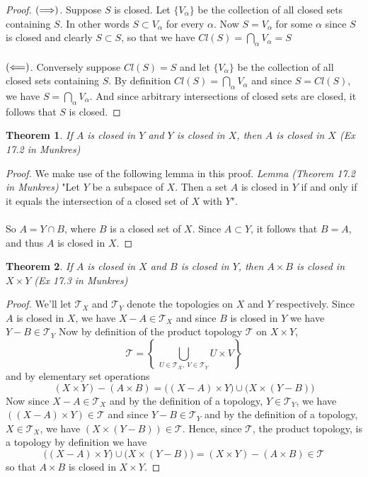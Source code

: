 \documentclass{article}
\newtheorem{theorem}{Theorem}[section]
\theoremstyle{remark}
\theoremstyle{definition}
\newcommand{\simplies}{\DOTSB\Longrightarrow}
\newcommand{\lsimplies}{\DOTSB\Longleftarrow}
\begin{document}
\begin{proof}[Proof]
$(\simplies)$. Suppose $S$ is closed. Let $\{V_{\alpha}\}$ be the collection of all closed sets containing $S$. In other words $S \subset V_{\alpha}$ for every $\alpha$. Now $S = V_{\alpha}$ for some $\alpha$ since $S$ is closed and clearly $S \subset S$, so that we have $Cl(S) = \bigcap_{\alpha}V_{\alpha} = S$
\\ \\ 
$(\lsimplies)$. Conversely suppose $Cl(S) = S$ and let $\{V_{\alpha}\}$ be the collection of all closed sets containing $S$. By definition $Cl(S) = \bigcap_{\alpha}V_{\alpha}$ and since $S = Cl(S)$, we have $S = \bigcap_{\alpha}V_{\alpha}$. And since arbitrary intersections of closed sets are closed, it follows that $S$ is closed.
\end{proof}
\medskip
\begin{theorem}
If $A$ is closed in $Y$ and $Y$ is closed in $X$, then $A$ is closed in $X$ (Ex 17.2 in Munkres)
\end{theorem}

\begin{proof}
We make use of the following lemma in this proof. 
\textit{Lemma (Theorem 17.2 in Munkres)} "Let $Y$ be a subspace of $X$. Then a set $A$ is closed in $Y$ if and only if it equals the intersection of a closed set of $X$ with $Y$".
\\ \\
So $A = Y \cap B$, where $B$ is a closed set of $X$. Since $A \subset Y$, it follows that $B = A$, and thus $A$ is closed in $X$.
\end{proof}
\medskip
\begin{theorem}
If $A$ is closed in $X$ and $B$ is closed in $Y$, then $A \times B$ is closed in $X \times Y$ (Ex 17.3 in Munkres)
\end{theorem}

\begin{proof}
We'll let $\mathcal{T}_X$ and $\mathcal{T}_Y$ denote the topologies on $X$ and $Y$ respectively. Since $A$ is closed in $X$, we have $X - A \in \mathcal{T}_X$ and since $B$ is closed in $Y$ we have $Y - B \in \mathcal{T}_Y$ Now by definition of the product topology $\mathcal{T}$ on $X \times Y$, $$\mathcal{T} = \left\{ \ \bigcup_{U \in \mathcal{T}_X, \ V \in \mathcal{T}_Y} U \times V \right\}$$ and by elementary set operations $$(X\times Y)-(A\times B)=\Big((X- A)\times Y\Big)\cup\Big(X\times(Y - B)\Big)$$
Now since $X - A \in \mathcal{T}_X$ and by the definition of a topology, $Y \in \mathcal{T}_Y$, we have $\left((X- A)\times Y\right) \in \mathcal{T}$ and since $Y - B \in \mathcal{T}_Y$ and by the definition of a topology, $X \in \mathcal{T}_X$, we have $\left(X\times(Y - B)\right) \in \mathcal{T}$. Hence, since $\mathcal{T}$, the product topology, is a topology by definition we have$$\Big((X- A)\times Y\Big)\cup\Big(X\times(Y - B)\Big) = (X\times Y)-(A\times B) \in \mathcal{T}$$ so that $A \times B$ is closed in $X \times Y$.
\end{proof}
\end{document}
